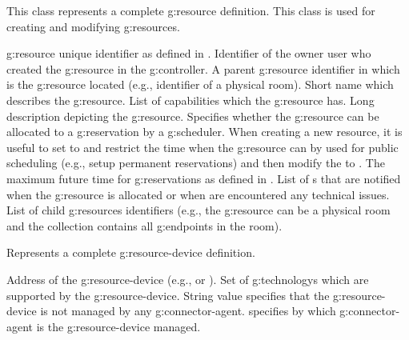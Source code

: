 \begin{Api}
This class represents a complete \gls{g:resource} definition. This class is used for creating and modifying \glspl{g:resource}.
\begin{ApiClassAttributes}
 \Gls{g:resource} unique identifier as defined in .
 Identifier of the owner user who created the \gls{g:resource} in the \gls{g:controller}.
 A parent \gls{g:resource} identifier in which is the \gls{g:resource} located (e.g., identifier of a physical room).
 Short name which describes the \gls{g:resource}.
 List of capabilities which the \gls{g:resource} has.
 Long description depicting the \gls{g:resource}.
 Specifies whether the \gls{g:resource} can be allocated to a \gls{g:reservation} by a \gls{g:scheduler}. When creating a new resource, it is useful to set  to  and restrict the time when the \gls{g:resource} can by used for public scheduling (e.g., setup permanent reservations) and then modify the  to .
 The maximum future time for \glspl{g:reservation} as defined in .
 List of s that are notified when the \gls{g:resource} is allocated or when are encountered any technical issues.
 List of child \glspl{g:resource} identifiers (e.g., the \gls{g:resource} can be a physical room and the collection  contains all \glspl{g:endpoint} in the room).
\end{ApiClassAttributes}

Represents a complete \gls{g:resource-device} definition.
\begin{ApiClassAttributes}
 Address of the \gls{g:resource-device} (e.g.,  or ).
Set of \glspl{g:technology} which are supported by the \gls{g:resource-device}.
 String value  specifies that the \gls{g:resource-device} is not managed by any \gls{g:connector-agent}.   specifies by which \gls{g:connector-agent} is the \gls{g:resource-device} managed.
\end{ApiClassAttributes}


\end{Api}
